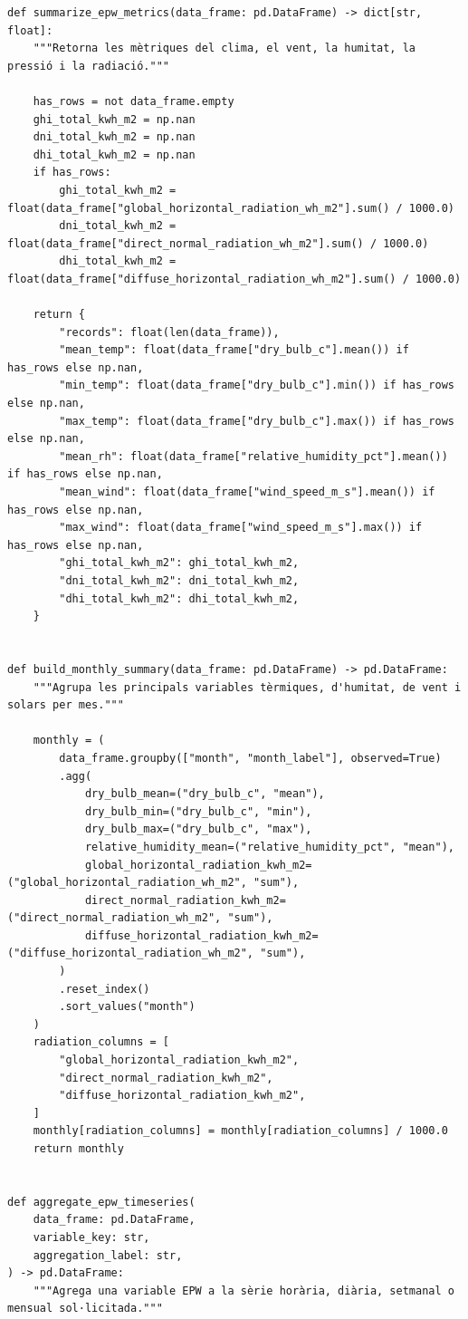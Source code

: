 \documentclass[10pt,a4paper]{article}
\begin{document}
\begin{lstlisting}[style=studioPython,caption={backend/visor\_epw\_backend.py},label={lst:backend-visor-epw-backend-py}]
def summarize_epw_metrics(data_frame: pd.DataFrame) -> dict[str, float]:
    """Retorna les mètriques del clima, el vent, la humitat, la pressió i la radiació."""

    has_rows = not data_frame.empty
    ghi_total_kwh_m2 = np.nan
    dni_total_kwh_m2 = np.nan
    dhi_total_kwh_m2 = np.nan
    if has_rows:
        ghi_total_kwh_m2 = float(data_frame["global_horizontal_radiation_wh_m2"].sum() / 1000.0)
        dni_total_kwh_m2 = float(data_frame["direct_normal_radiation_wh_m2"].sum() / 1000.0)
        dhi_total_kwh_m2 = float(data_frame["diffuse_horizontal_radiation_wh_m2"].sum() / 1000.0)

    return {
        "records": float(len(data_frame)),
        "mean_temp": float(data_frame["dry_bulb_c"].mean()) if has_rows else np.nan,
        "min_temp": float(data_frame["dry_bulb_c"].min()) if has_rows else np.nan,
        "max_temp": float(data_frame["dry_bulb_c"].max()) if has_rows else np.nan,
        "mean_rh": float(data_frame["relative_humidity_pct"].mean()) if has_rows else np.nan,
        "mean_wind": float(data_frame["wind_speed_m_s"].mean()) if has_rows else np.nan,
        "max_wind": float(data_frame["wind_speed_m_s"].max()) if has_rows else np.nan,
        "ghi_total_kwh_m2": ghi_total_kwh_m2,
        "dni_total_kwh_m2": dni_total_kwh_m2,
        "dhi_total_kwh_m2": dhi_total_kwh_m2,
    }


def build_monthly_summary(data_frame: pd.DataFrame) -> pd.DataFrame:
    """Agrupa les principals variables tèrmiques, d'humitat, de vent i solars per mes."""

    monthly = (
        data_frame.groupby(["month", "month_label"], observed=True)
        .agg(
            dry_bulb_mean=("dry_bulb_c", "mean"),
            dry_bulb_min=("dry_bulb_c", "min"),
            dry_bulb_max=("dry_bulb_c", "max"),
            relative_humidity_mean=("relative_humidity_pct", "mean"),
            global_horizontal_radiation_kwh_m2=("global_horizontal_radiation_wh_m2", "sum"),
            direct_normal_radiation_kwh_m2=("direct_normal_radiation_wh_m2", "sum"),
            diffuse_horizontal_radiation_kwh_m2=("diffuse_horizontal_radiation_wh_m2", "sum"),
        )
        .reset_index()
        .sort_values("month")
    )
    radiation_columns = [
        "global_horizontal_radiation_kwh_m2",
        "direct_normal_radiation_kwh_m2",
        "diffuse_horizontal_radiation_kwh_m2",
    ]
    monthly[radiation_columns] = monthly[radiation_columns] / 1000.0
    return monthly


def aggregate_epw_timeseries(
    data_frame: pd.DataFrame,
    variable_key: str,
    aggregation_label: str,
) -> pd.DataFrame:
    """Agrega una variable EPW a la sèrie horària, diària, setmanal o mensual sol·licitada."""


\end{lstlisting}
\end{document}
